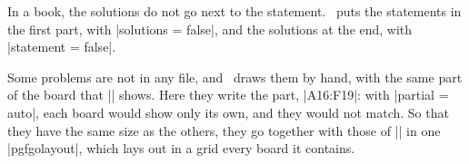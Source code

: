 \begin{goban}
In a book, the solutions do not go next to the statement. \karu\ puts the statements in the first part, with |solutions = false|, and the solutions at the end, with |statement = false|.

\begin{codeexample}
\end{codeexample}



Some problems are not in any file, and \karu\ draws them by hand, with the same part of the board that |\sgfproblem| shows. Here they write the part, |A16:F19|: with |partial = auto|, each board would show only its own, and they would not match. So that they have the same size as the others, they go together with those of |\sgfproblem| in one |pgfgolayout|, which lays out in a grid every board it contains.

\begin{codeexample}
	\begin{pgfgolayout}[columns = 3, fit]
		\begin{goban}[19, partial = A16:F19]
		\end{goban}
		\begin{goban}[19, partial = A16:F19]
		\end{goban}
	\end{pgfgolayout}
\end{codeexample}

\begin{pgfgolayout}[columns = 3, fit]
	\begin{goban}[19, partial = A16:F19]
	\end{goban}
	\begin{goban}[19, partial = A16:F19]
	\end{goban}
\end{pgfgolayout}


\end{goban}
